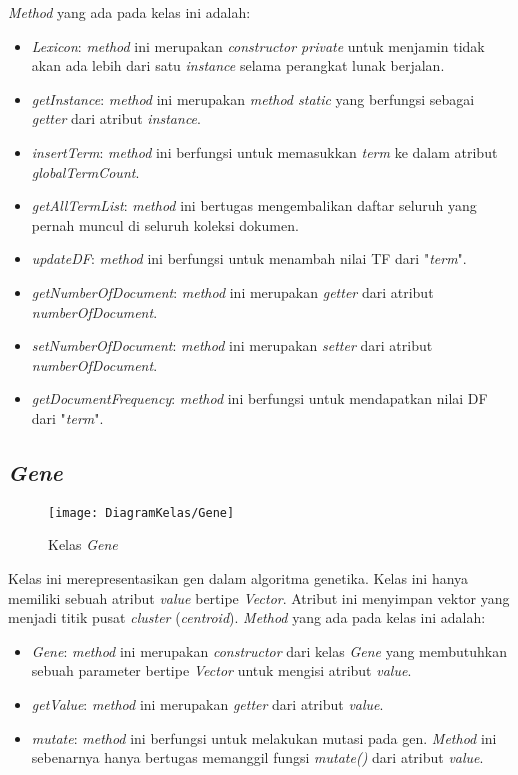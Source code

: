 \textit{Method} yang ada pada kelas ini adalah:

\begin{itemize}
	\item \textit{Lexicon}: \textit{method} ini merupakan \textit{constructor private} untuk menjamin tidak akan ada lebih dari satu \textit{instance} selama perangkat lunak berjalan.
	\item \textit{getInstance}: \textit{method} ini merupakan \textit{method static} yang berfungsi sebagai \textit{getter} dari atribut \textit{instance}.
	\item \textit{insertTerm}: \textit{method} ini berfungsi untuk memasukkan \textit{term} ke dalam atribut \textit{globalTermCount}.
	\item \textit{getAllTermList}: \textit{method} ini bertugas mengembalikan daftar seluruh \term yang pernah muncul di seluruh koleksi dokumen.
	\item \textit{updateDF}: \textit{method} ini berfungsi untuk menambah nilai TF dari \term "\textit{term}".
	\item \textit{getNumberOfDocument}: \textit{method} ini merupakan \textit{getter} dari atribut \textit{numberOfDocument}.
	\item \textit{setNumberOfDocument}: \textit{method} ini merupakan \textit{setter} dari atribut \textit{numberOfDocument}.
	\item \textit{getDocumentFrequency}: \textit{method} ini berfungsi untuk mendapatkan nilai DF dari \term "\textit{term}".
\end{itemize}

\subsection{\textit{Gene}}

\begin{figure}[H]
	\begin{center}
		\texttt{[image: DiagramKelas/Gene]}
		\caption{Kelas \textit{Gene}}
		\label{fig:kelasGene}
	\end{center}
\end{figure}

Kelas ini merepresentasikan gen dalam algoritma genetika. Kelas ini hanya memiliki sebuah atribut \textit{value} bertipe \textit{Vector}. Atribut ini menyimpan vektor yang menjadi titik pusat \textit{cluster} (\textit{centroid}). \textit{Method} yang ada pada kelas ini adalah:

\begin{itemize}
	\item \textit{Gene}: \textit{method} ini merupakan \textit{constructor} dari kelas \textit{Gene} yang membutuhkan sebuah parameter bertipe \textit{Vector} untuk mengisi atribut \textit{value}.
	\item \textit{getValue}: \textit{method} ini merupakan \textit{getter} dari atribut \textit{value}.
	\item \textit{mutate}: \textit{method} ini berfungsi untuk melakukan mutasi pada gen. \textit{Method} ini sebenarnya hanya bertugas memanggil fungsi \textit{mutate()} dari atribut \textit{value}.
\end{itemize}

